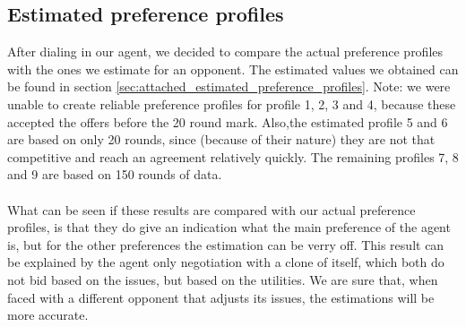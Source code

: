 \subsection{Estimated preference profiles}

After dialing in our agent, we decided to compare the actual preference profiles with the ones we estimate for an opponent.
The estimated values we obtained can be found in section \ref{sec:attached_estimated_preference_profiles}. Note: we were unable to create reliable preference profiles for profile 1, 2, 3 and 4, because these accepted the offers before the 20 round mark. Also,the estimated profile 5 and 6 are based on only 20 rounds, since (because of their nature) they are not that competitive and reach an agreement relatively quickly. The remaining profiles 7, 8 and 9 are based on 150 rounds of data.
\\\\
What can be seen if these results are compared with our actual preference profiles, is that they do give an indication what the main preference of the agent is, but for the other preferences the estimation can be verry off. This result can be explained by the agent only negotiation with a clone of itself, which both do not bid based on the issues, but based on the utilities. We are sure that, when faced with a different opponent that adjusts its issues, the estimations will be more accurate.